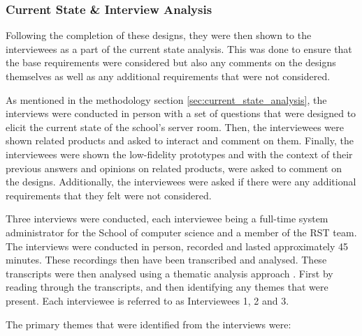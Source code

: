\documentclass [11pt,a4paper]{article}
\begin{document}
\subsubsection{Current State \& Interview Analysis}
\label{sec:ui_design_interview_analysis}
Following the completion of these designs, they were then shown to the interviewees as a part of the current state analysis. This was done to ensure that the base requirements were considered but also any comments on the designs themselves as well as any additional requirements that were not considered. 

As mentioned in the methodology section \ref{sec:current_state_analysis}, the interviews were conducted in person with a set of questions that were designed to elicit the current state of the school's server room. Then, the interviewees were shown related products and asked to interact and comment on them. Finally, the interviewees were shown the low-fidelity prototypes and with the context of their previous answers and opinions on related products, were asked to comment on the designs. Additionally, the interviewees were asked if there were any additional requirements that they felt were not considered.

Three interviews were conducted, each interviewee being a full-time system administrator for the School of computer science and a member of the RST team. The interviews were conducted in person, recorded and lasted approximately 45 minutes. These recordings then have been transcribed and analysed. These transcripts were then analysed using a thematic analysis approach \cite{thematicAnal}. First by reading through the transcripts, and then identifying any themes that were present. Each interviewee is referred to as Interviewees 1, 2 and 3. 

The primary themes that were identified from the interviews were:
\end{document}
